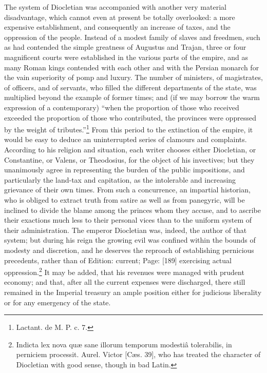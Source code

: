 The system of Diocletian was accompanied with another very material disadvantage, which cannot even at present be totally overlooked: a more expensive establishment, and consequently an increase of taxes, and the oppression of the people. Instead of a modest family of slaves and freedmen, such as had contended the simple greatness of Augustus and Trajan, three or four magnificent courts were established in the various parts of the empire, and as many Roman kings contended with each other and with the Persian monarch for the vain superiority of pomp and luxury. The number of ministers, of magistrates, of officers, and of servants, who filled the different departments of the state, was multiplied beyond the example of former times; and (if we may borrow the warm expression of a contemporary) \texthebrew{“}when the proportion of those who received exceeded the proportion of those who contributed, the provinces were oppressed by the weight of tributes.\texthebrew{}”\footnote{Lactant. de M. P. c. 7.} From this period to the extinction of the empire, it would be easy to deduce an uninterrupted series of clamours and complaints. According to his religion and situation, each writer chooses either Diocletian, or Constantine, or Valens, or Theodosius, for the object of his invectives; but they unanimously agree in representing the burden of the public impositions, and particularly the land-tax and capitation, as the intolerable and increasing grievance of their own times. From such a concurrence, an impartial historian, who is obliged to extract truth from satire as well as from panegyric, will be inclined to divide the blame among the princes whom they accuse, and to ascribe their exactions much less to their personal vices than to the uniform system of their administration. The emperor Diocletian was, indeed, the author of that system; but during his reign the growing evil was confined within the bounds of modesty and discretion, and he deserves the reproach of establishing pernicious precedents, rather than of Edition: current; Page: [189] exercising actual oppression.\footnote{Indicta lex nova quæ sane illorum temporum modestiâ tolerabilis, in perniciem processit. Aurel. Victor [Cæs. 39], who has treated the character of Diocletian with good sense, though in bad Latin.} It may be added, that his revenues were managed with prudent economy; and that, after all the current expenses were discharged, there still remained in the Imperial treasury an ample position either for judicious liberality or for any emergency of the state.

